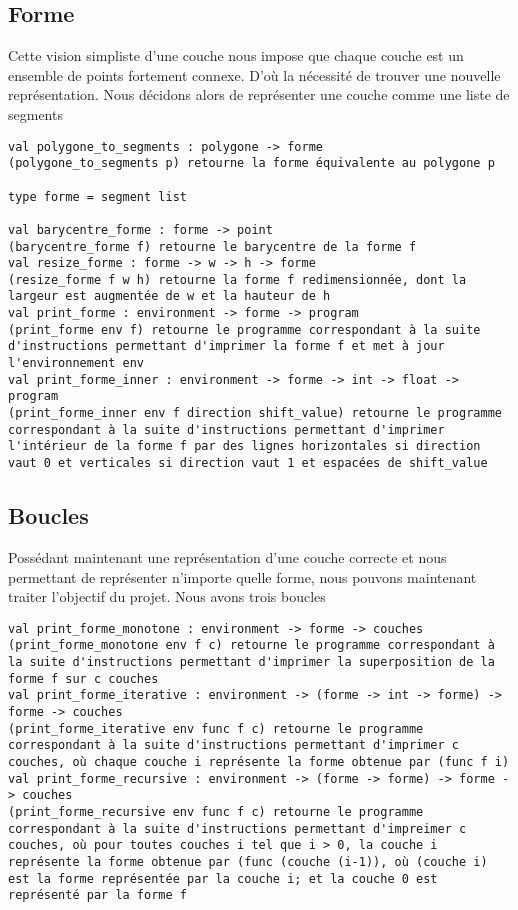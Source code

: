 \documentclass[11pt, titlepage]{article}
\begin{document}
\subsection{Forme}
Cette vision simpliste d'une couche nous impose que chaque couche est un ensemble de points fortement connexe. D'où la nécessité de trouver une nouvelle représentation. Nous décidons alors de représenter une couche comme une liste de segments

\begin{lstlisting}
val polygone_to_segments : polygone -> forme
(polygone_to_segments p) retourne la forme équivalente au polygone p

type forme = segment list

val barycentre_forme : forme -> point
(barycentre_forme f) retourne le barycentre de la forme f
val resize_forme : forme -> w -> h -> forme
(resize_forme f w h) retourne la forme f redimensionnée, dont la largeur est augmentée de w et la hauteur de h
val print_forme : environment -> forme -> program
(print_forme env f) retourne le programme correspondant à la suite d'instructions permettant d'imprimer la forme f et met à jour l'environnement env
val print_forme_inner : environment -> forme -> int -> float -> program
(print_forme_inner env f direction shift_value) retourne le programme correspondant à la suite d'instructions permettant d'imprimer l'intérieur de la forme f par des lignes horizontales si direction vaut 0 et verticales si direction vaut 1 et espacées de shift_value
\end{lstlisting}

\subsection{Boucles}
Possédant maintenant une représentation d'une couche correcte et nous permettant de représenter n'importe quelle forme, nous pouvons maintenant traiter l'objectif du projet.
Nous avons trois boucles

\begin{lstlisting}
val print_forme_monotone : environment -> forme -> couches
(print_forme_monotone env f c) retourne le programme correspondant à la suite d'instructions permettant d'imprimer la superposition de la forme f sur c couches
val print_forme_iterative : environment -> (forme -> int -> forme) -> forme -> couches
(print_forme_iterative env func f c) retourne le programme correspondant à la suite d'instructions permettant d'imprimer c couches, où chaque couche i représente la forme obtenue par (func f i)
val print_forme_recursive : environment -> (forme -> forme) -> forme -> couches
(print_forme_recursive env func f c) retourne le programme correspondant à la suite d'instructions permettant d'impreimer c couches, où pour toutes couches i tel que i > 0, la couche i représente la forme obtenue par (func (couche (i-1)), où (couche i) est la forme représentée par la couche i; et la couche 0 est représenté par la forme f
\end{lstlisting}
\newpage
\end{document}
